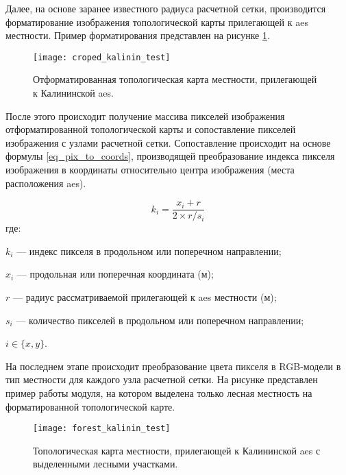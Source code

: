 Далее, на основе заранее известного радиуса расчетной сетки, производится форматирование изображения топологической 
карты прилегающей к \ac{aes} местности. Пример форматирования представлен на рисунке \ref{fig_cropped_map_scheme}.

\begin{figure}[ht]
\centering
    \texttt{[image: croped\_kalinin\_test]}
    \captionsetup{justification=centering}
    \caption{Отформатированная топологическая карта местности, прилегающей к Калининской \ac{aes}.}
    \label{fig_cropped_map_scheme}
\end{figure}

После этого происходит получение массива пикселей изображения отформатированной топологической карты и сопоставление 
пикселей изображения с узлами расчетной сетки. Сопоставление происходит на основе формулы \ref{eq_pix_to_coords}, 
производящей преобразование индекса пикселя изображения в координаты относительно центра изображения (места расположения 
\ac{aes}).

\begin{equation}
    \label{eq_pix_to_coords}
    k_i = \frac{x_i+r}{2 \times r / s_i}    
\end{equation}
где:
\begin{description}
    \item $k_i$ --- индекс пикселя в продольном или поперечном направлении;
    \item $x_i$ --- продольная или поперечная координата (м);
    \item $r$ --- радиус рассматриваемой прилегающей к \ac{aes} местности (м);
    \item $s_i$ --- количество пикселей в продольном или поперечном направлении;
    \item $i \in \{x, y\}$.
\end{description}

На последнем этапе происходит преобразование цвета пикселя в RGB-модели в тип местности для каждого узла расчетной сетки.
На рисунке  представлен пример работы модуля, на котором выделена только лесная местность 
на форматированной топологической карте. 

\begin{figure}[ht]
\centering
    \texttt{[image: forest\_kalinin\_test]}
    \captionsetup{justification=centering}
    \caption{Топологическая карта местности, прилегающей к Калининской \ac{aes} с выделенными лесными участками.}
    \label{fig_forest_map_scheme}
\end{figure}


